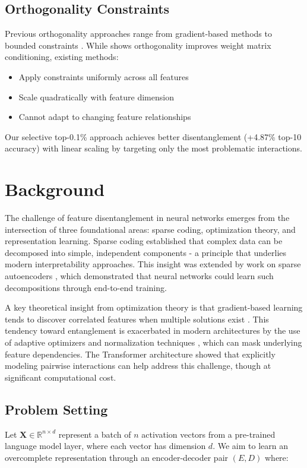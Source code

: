\documentclass{article} %
\begin{document}
\subsection{Orthogonality Constraints}
Previous orthogonality approaches range from gradient-based methods \cite{Suteu2019RegularizingDM} to bounded constraints \cite{Zhang2022BortTE}. While \cite{Eryilmaz2022UnderstandingHO} shows orthogonality improves weight matrix conditioning, existing methods:
\begin{itemize}
    \item Apply constraints uniformly across all features
    \item Scale quadratically with feature dimension
    \item Cannot adapt to changing feature relationships
\end{itemize}
Our selective top-0.1\% approach achieves better disentanglement (+4.87\% top-10 accuracy) with linear scaling by targeting only the most problematic interactions.

\section{Background}
\label{sec:background}

The challenge of feature disentanglement in neural networks emerges from the intersection of three foundational areas: sparse coding, optimization theory, and representation learning. Sparse coding \cite{Olshausen1996EmergenceOS} established that complex data can be decomposed into simple, independent components - a principle that underlies modern interpretability approaches. This insight was extended by work on sparse autoencoders \cite{goodfellow2016deep}, which demonstrated that neural networks could learn such decompositions through end-to-end training.

A key theoretical insight from optimization theory is that gradient-based learning tends to discover correlated features when multiple solutions exist \cite{Pascanu2012OnTD}. This tendency toward entanglement is exacerbated in modern architectures by the use of adaptive optimizers \cite{kingma2014adam} and normalization techniques \cite{ba2016layer}, which can mask underlying feature dependencies. The Transformer architecture \cite{vaswani2017attention} showed that explicitly modeling pairwise interactions can help address this challenge, though at significant computational cost.

\subsection{Problem Setting}
Let $\mathbf{X} \in \mathbb{R}^{n \times d}$ represent a batch of $n$ activation vectors from a pre-trained language model layer, where each vector has dimension $d$. We aim to learn an overcomplete representation through an encoder-decoder pair $(E,D)$ where:
\end{document}
